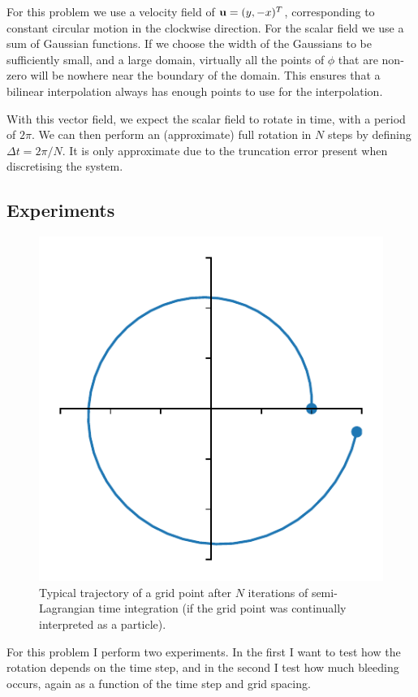 \documentclass[sigconf]{acmart}
\begin{document}
For this problem we use a velocity field of $ \mathbf{u} = (y, -x)^T $, corresponding to constant circular motion in the clockwise direction. For the scalar field we use a sum of Gaussian functions. If we choose the width of the Gaussians to be sufficiently small, and a large domain, virtually all the points of $ \phi $ that are non-zero will be nowhere near the boundary of the domain. This ensures that a bilinear interpolation always has enough points to use for the interpolation.

With this vector field, we expect the scalar field to rotate in time, with a period of $ 2\pi $. We can then perform an (approximate) full rotation in $ N $ steps by defining $ \Delta t = 2\pi/N $. It is only approximate due to the truncation error present when discretising the system.


\subsection{Experiments}
\begin{figure}
	\centering
	\includegraphics[width=0.7\linewidth]{spiral.pdf}
	\caption{Typical trajectory of a grid point after $ N $ iterations of semi-Lagrangian time integration (if the grid point was continually interpreted as a particle).}
	\label{fig:spiral}
\end{figure}
For this problem I perform two experiments. In the first I want to test how the rotation depends on the time step, and in the second I test how much bleeding occurs, again as a function of the time step and grid spacing.
\end{document}

